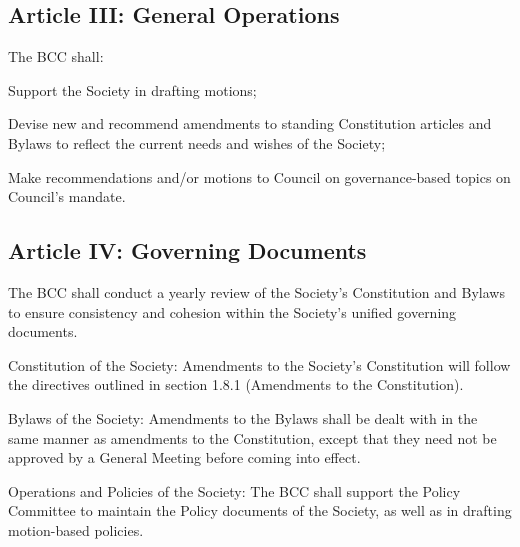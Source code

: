 \subsection{Article III: General Operations}
\begin{longenum}[ label*=\thesubsection.\arabic*., align=left] 
\item The BCC shall:
	\begin{longenum}[ label*=\arabic*., align=left] 
	\item Support the Society in drafting motions;
	\item Devise new and recommend amendments to standing Constitution articles and Bylaws to reflect the current needs and wishes of the Society;
	\item Make recommendations and/or motions to Council on governance-based topics on Council's mandate.
	\end{longenum}
\end{longenum}



\subsection{Article IV: Governing Documents}
\begin{longenum}[ label*=\thesubsection.\arabic*., align=left] 
\item The BCC shall conduct a yearly review of the Society's Constitution and Bylaws to ensure consistency and cohesion within the Society's unified governing documents.
\item Constitution of the Society: Amendments to the Society's Constitution will follow the directives outlined in section 1.8.1 (Amendments to the Constitution).
\item Bylaws of the Society: Amendments to the Bylaws shall be dealt with in the same manner as amendments to the Constitution, except that they need not be approved by a General Meeting before coming into effect.
\item Operations and Policies of the Society: The BCC shall support the Policy Committee to maintain the Policy documents of the Society, as well as in drafting motion-based policies.
\end{longenum}

